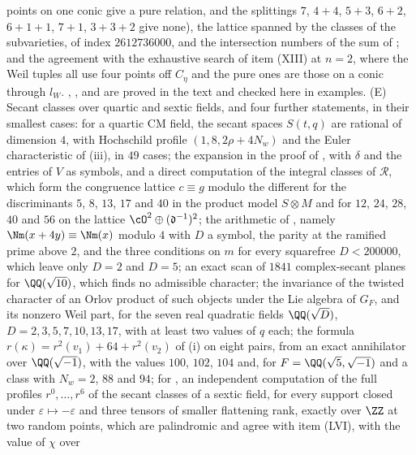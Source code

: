 \begin{enumerate}[label=\textup{(\Roman*)},leftmargin=*]
  points on one conic give a pure relation, and the splittings $7$, $4+4$,
  $5+3$, $6+2$, $6+1+1$, $7+1$, $3+3+2$ give none), the lattice spanned by
  the classes of the subvarieties, of index $2612736000$, and the intersection
  numbers of the sum of ; and the agreement with the
  exhaustive search of item (XIII) at $n=2$, where the Weil tuples all use
  four points off $C_{\eta}$ and the pure ones are those on a conic through
  $l_{W}$. , ,
   and  are proved in the text
  and checked here in examples. (E) Secant classes over quartic and sextic
  fields, and four further statements, in their smallest cases: for a
  quartic CM field, the secant spaces $S(t,q)$ are rational of dimension $4$, with Hochschild profile $(1,8,2\rho+4N_{w})$ and
  the Euler characteristic of (iii), in $49$ cases;
  the expansion in the proof of , with $\delta$ and
  the entries of $V$ as symbols, and a direct computation of the integral
  classes of $\mathcal{R}$, which form the congruence lattice $c\equiv g$
  modulo the different for the discriminants $5$, $8$, $13$, $17$ and $40$ in
  the product model $S\otimes M$ and for $12$, $24$, $28$, $40$ and $56$ on
  the lattice $\cO^{2}\oplus(\mathfrak d^{-1})^{2}$; the arithmetic of
  , namely $\Nm(x+4y)\equiv\Nm(x)$ modulo $4$ with
  $D$ a symbol, the parity at the ramified prime above $2$, and the three
  conditions on $m$ for every squarefree $D<200000$, which leave only $D=2$
  and $D=5$; an exact scan of $1841$ complex-secant planes for
  $\QQ(\sqrt{10})$, which finds no admissible character; the invariance of
  the twisted character of an Orlov product of such objects under the Lie
  algebra of $G_{F}$, and its nonzero Weil part, for the seven real
  quadratic fields $\QQ(\sqrt D)$, $D=2,3,5,7,10,13,17$, with at least two
  values of $q$ each; the formula $r(\kappa)=r^{2}(v_{1})+64+r^{2}(v_{2})$
  of (i) on eight pairs, from an exact annihilator
  over $\QQ(\sqrt{-1})$, with the values $100$, $102$, $104$ and, for
  $F=\QQ(\sqrt5,\sqrt{-1})$ and a class with $N_{w}=2$, $88$ and $94$; for
  , an independent computation of the full profiles
  $r^{0},\dots,r^{6}$ of the secant classes of a sextic field, for every
  support closed under $\varepsilon\mapsto-\varepsilon$ and three tensors of
  smaller flattening rank, exactly over $\ZZ$ at two random points, which are
  palindromic and agree with item (LVI), with the value of $\chi$ over

\end{enumerate}
